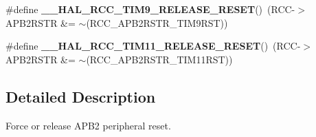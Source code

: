 \begin{DoxyCompactItemize}
\item 
\#define {\bfseries \+\_\+\+\_\+\+H\+A\+L\+\_\+\+R\+C\+C\+\_\+\+T\+I\+M9\+\_\+\+R\+E\+L\+E\+A\+S\+E\+\_\+\+R\+E\+S\+ET}()~(R\+CC-\/$>$A\+P\+B2\+R\+S\+TR \&= $\sim$(R\+C\+C\+\_\+\+A\+P\+B2\+R\+S\+T\+R\+\_\+\+T\+I\+M9\+R\+ST))\hypertarget{group___r_c_c___a_p_b2___force___release___reset_ga71fee37e3aff2c5040e2e9f4e153f4ff}{}\label{group___r_c_c___a_p_b2___force___release___reset_ga71fee37e3aff2c5040e2e9f4e153f4ff}

\item 
\#define {\bfseries \+\_\+\+\_\+\+H\+A\+L\+\_\+\+R\+C\+C\+\_\+\+T\+I\+M11\+\_\+\+R\+E\+L\+E\+A\+S\+E\+\_\+\+R\+E\+S\+ET}()~(R\+CC-\/$>$A\+P\+B2\+R\+S\+TR \&= $\sim$(R\+C\+C\+\_\+\+A\+P\+B2\+R\+S\+T\+R\+\_\+\+T\+I\+M11\+R\+ST))\hypertarget{group___r_c_c___a_p_b2___force___release___reset_gab66378d2b26c2c47522f268e129b6709}{}\label{group___r_c_c___a_p_b2___force___release___reset_gab66378d2b26c2c47522f268e129b6709}

\end{DoxyCompactItemize}


\subsection{Detailed Description}
Force or release A\+P\+B2 peripheral reset. 

